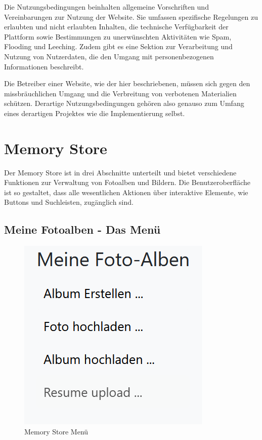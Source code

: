 Die Nutzungsbedingungen beinhalten allgemeine Vorschriften und Vereinbarungen zur 
Nutzung der Website. Sie umfassen spezifische Regelungen zu erlaubten und nicht 
erlaubten Inhalten, die technische Verfügbarkeit der Plattform sowie Bestimmungen 
zu unerwünschten Aktivitäten wie Spam, Flooding und Leeching. Zudem gibt es eine 
Sektion zur Verarbeitung und Nutzung von Nutzerdaten, die den Umgang mit 
personenbezogenen Informationen beschreibt.

Die Betreiber einer Website, wie der hier beschriebenen, müssen sich gegen den 
missbräuchlichen Umgang und die Verbreitung von verbotenen Materialien schützen. 
Derartige Nutzungsbedingungen gehören also genauso zum Umfang eines derartigen Projektes
wie die Implementierung selbst.






\section{Memory Store}

Der Memory Store ist in drei Abschnitte unterteilt und bietet verschiedene Funktionen 
zur Verwaltung von Fotoalben und Bildern. Die Benutzeroberfläche ist so gestaltet, 
dass alle wesentlichen Aktionen über interaktive Elemente, wie Buttons und 
Suchleisten, zugänglich sind.

\subsection{Meine Fotoalben - Das Menü}

\begin{figure}
    \centering
    \includegraphics[scale=0.8]{pics/memory_store_menu.PNG}
    \caption{Memory Store Menü}
    \label{fig:memory-store-menu}
\end{figure}


